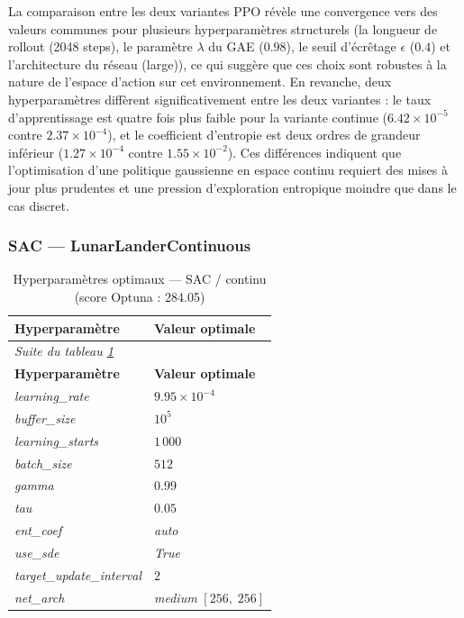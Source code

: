 \medskip
 
La comparaison entre les deux variantes PPO révèle une convergence vers des
valeurs communes pour plusieurs hyperparamètres structurels (la longueur de rollout (2048 steps), le paramètre $\lambda$ du GAE ($0.98$), le seuil d'écrêtage $\epsilon$ ($0.4$) et l'architecture du réseau (large)), ce qui suggère que ces choix sont robustes à la nature de l'espace d'action sur cet environnement. En revanche, deux hyperparamètres diffèrent significativement entre les deux variantes : le taux d'apprentissage est quatre fois plus faible pour la variante continue ($6.42 \times 10^{-5}$ contre $2.37 \times 10^{-4}$), et le coefficient d'entropie est deux ordres de grandeur inférieur ($1.27 \times 10^{-4}$ contre $1.55 \times 10^{-2}$). Ces différences indiquent que l'optimisation d'une politique gaussienne en espace continu requiert des mises à jour plus prudentes et une pression d'exploration entropique moindre que dans le cas discret.
 
\newpage
\subsubsection{SAC --- LunarLanderContinuous}
 
\begingroup
\footnotesize
\setlength{\tabcolsep}{8pt}
\renewcommand{\arraystretch}{1.4}
\begin{longtable}{%
  p{\hpOptA}%
  p{\dimexpr\textwidth - \hpOptA - 4\tabcolsep\relax}%
}
  \caption{Hyperparamètres optimaux --- SAC / continu (score Optuna : 284.05)}
  \label{tab:hparams_opt_sac}\\
  \toprule
  \textbf{Hyperparamètre} & \textbf{Valeur optimale} \\
  \midrule
\endfirsthead
  \multicolumn{2}{l}{\footnotesize\itshape Suite du tableau \ref{tab:hparams_opt_sac}}\\[2pt]
  \toprule
  \textbf{Hyperparamètre} & \textbf{Valeur optimale} \\
  \midrule
\endhead
  \bottomrule
\endlastfoot
 
\textit{learning\_rate}           & $9.95 \times 10^{-4}$ \\
\textit{buffer\_size}             & $10^{5}$ \\
\textit{learning\_starts}         & $1\,000$ \\
\textit{batch\_size}              & $512$ \\
\textit{gamma}                    & $0.99$ \\
\textit{tau}                      & $0.05$ \\
\textit{ent\_coef}                & \textit{auto} \\
\textit{use\_sde}                 & \textit{True} \\
\textit{target\_update\_interval} & $2$ \\
\textit{net\_arch}                & \textit{medium} $[256,\;256]$ \\
\end{longtable}
\endgroup
 
